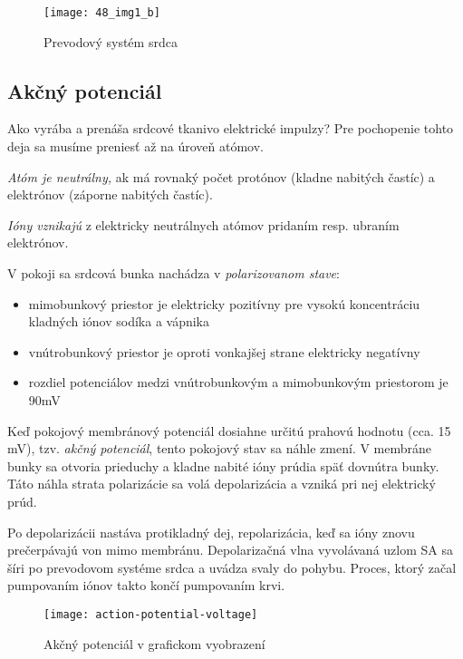 \documentclass[titlepage,12pt]{article}
\begin{document}
\begin{figure}[!ht]
\begin{center}
\texttt{[image: 48\_img1\_b]}
\caption{Prevodový systém srdca}
\end{center}
\end{figure}

\newpage
\subsection{Akčný potenciál}
Ako vyrába a prenáša srdcové tkanivo elektrické impulzy? Pre pochopenie tohto deja sa musíme preniesť až na úroveň atómov.

\emph{Atóm je neutrálny,} ak má rovnaký počet protónov (kladne nabitých častíc) a elektrónov (záporne nabitých častíc). 

\emph{Ióny vznikajú} z elektricky neutrálnych atómov pridaním resp. ubraním elektrónov. 

V pokoji sa srdcová bunka nachádza v \emph{polarizovanom stave}:
\begin{itemize}
	\item mimobunkový priestor je elektricky pozitívny pre vysokú koncentráciu kladných iónov sodíka a vápnika
	\item vnútrobunkový priestor je oproti vonkajšej strane elektricky negatívny
	\item rozdiel potenciálov medzi vnútrobunkovým a mimobunkovým priestorom je 90mV
\end{itemize}

Keď pokojový membránový potenciál dosiahne určitú prahovú hodnotu (cca. 15 mV), tzv. \emph{akčný potenciál}, tento pokojový stav sa náhle zmení. V membráne bunky sa otvoria prieduchy a kladne nabité ióny prúdia späť dovnútra bunky. Táto náhla strata polarizácie sa volá depolarizácia a vzniká pri nej elektrický prúd.

Po depolarizácii nastáva protikladný dej, repolarizácia, keď sa ióny znovu prečerpávajú von mimo membránu. Depolarizačná vlna vyvolávaná uzlom SA sa šíri po prevodovom systéme srdca a uvádza svaly do pohybu. Proces, ktorý začal pumpovaním iónov takto končí pumpovaním krvi. 

\begin{figure}[!ht]
\begin{center}
\texttt{[image: action-potential-voltage]}
\caption{Akčný potenciál v grafickom vyobrazení}
\end{center}
\end{figure}
\end{document}
